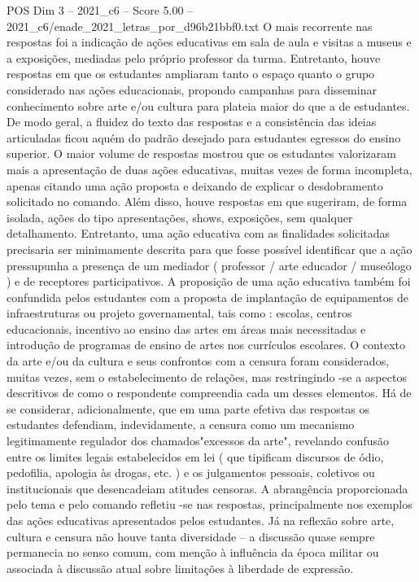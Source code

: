 \begin{textsample}{POS Dim 3 – 2021\_c6 – Score 5.00 – 2021\_c6/enade\_2021\_letras\_por\_d96b21bbf0.txt}
O mais recorrente nas respostas foi a indicação de ações educativas em sala de aula e visitas a museus e a exposições, mediadas pelo próprio professor da turma.
Entretanto, houve respostas em que os estudantes ampliaram tanto o espaço quanto o grupo considerado nas ações educacionais, propondo campanhas para disseminar conhecimento sobre arte e/ou cultura para plateia maior do que a de estudantes.
De modo geral, a fluidez do texto das respostas e a consistência das ideias articuladas ficou aquém do padrão desejado para estudantes egressos do ensino superior.
O maior volume de respostas mostrou que os estudantes valorizaram mais a apresentação de duas ações educativas, muitas vezes de forma incompleta, apenas citando uma ação proposta e deixando de explicar o desdobramento solicitado no comando.
Além disso, houve respostas em que sugeriram, de forma isolada, ações do tipo apresentações, shows, exposições, sem qualquer detalhamento.
Entretanto, uma ação educativa com as finalidades solicitadas precisaria ser minimamente descrita para que fosse possível identificar que a ação pressupunha a presença de um mediador ( professor / arte educador / museólogo ) e de receptores participativos.
A proposição de uma ação educativa também foi confundida pelos estudantes com a proposta de implantação de equipamentos de infraestruturas ou projeto governamental, tais como : escolas, centros educacionais, incentivo ao ensino das artes em áreas mais necessitadas e introdução de programas de ensino de artes nos currículos escolares.
O contexto da arte e/ou da cultura e seus confrontos com a censura foram considerados, muitas vezes, sem o estabelecimento de relações, mas restringindo -se a aspectos descritivos de como o respondente compreendia cada um desses elementos.
Há de se considerar, adicionalmente, que em uma parte efetiva das respostas os estudantes defendiam, indevidamente, a censura como um mecanismo legitimamente regulador dos chamados"excessos da arte", revelando confusão entre os limites legais estabelecidos em lei ( que tipificam discursos de ódio, pedofilia, apologia às drogas, etc. ) e os julgamentos pessoais, coletivos ou institucionais que desencadeiam atitudes censoras.
A abrangência proporcionada pelo tema e pelo comando refletiu -se nas respostas, principalmente nos exemplos das ações educativas apresentados pelos estudantes.
Já na reflexão sobre arte, cultura e censura não houve tanta diversidade – a discussão quase sempre permanecia no senso comum, com menção à influência da época militar ou associada à discussão atual sobre limitações à liberdade de expressão.

\end{textsample}

